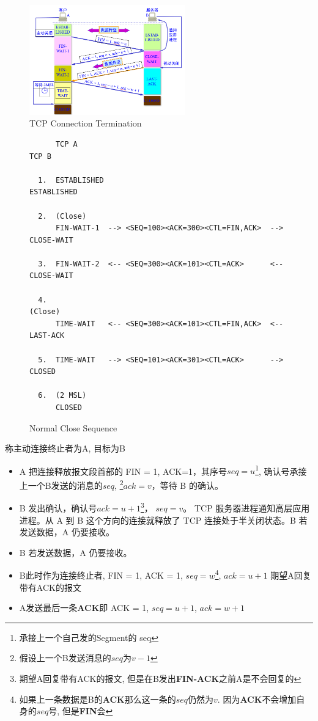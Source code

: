 \documentclass[a4paper]{report}
\begin{document}
\begin{figure}[H]
\centering
\includegraphics[width=0.6\textwidth]{tcp_close.png}
\caption{TCP Connection Termination}
\end{figure}

\begin{figure}[H]
\centering
\begin{verbatim}
      TCP A                                                TCP B

  1.  ESTABLISHED                                          ESTABLISHED

  2.  (Close)
      FIN-WAIT-1  --> <SEQ=100><ACK=300><CTL=FIN,ACK>  --> CLOSE-WAIT

  3.  FIN-WAIT-2  <-- <SEQ=300><ACK=101><CTL=ACK>      <-- CLOSE-WAIT

  4.                                                       (Close)
      TIME-WAIT   <-- <SEQ=300><ACK=101><CTL=FIN,ACK>  <-- LAST-ACK

  5.  TIME-WAIT   --> <SEQ=101><ACK=301><CTL=ACK>      --> CLOSED

  6.  (2 MSL)
      CLOSED
\end{verbatim}
\caption{Normal Close Sequence}
\end{figure}
称主动连接终止者为A, 目标为B
\begin{itemize}
  \item A 把连接释放报文段首部的 FIN = 1, ACK=1，其序号$seq = u$\footnote{承接上一个自己发的Segment的 seq}, 确认号承接上一个B发送的消息的$seq$, \footnote{假设上一个B发送消息的$seq$为$v-1$}$ack=v$，等待 B 的确认。
  \item B 发出确认，确认号$ack = u +1$\footnote{期望A回复带有ACK的报文, 但是在B发出\textbf{FIN-ACK}之前A是不会回复的}， $seq = v$。
  \subitem TCP 服务器进程通知高层应用进程。从 A 到 B 这个方向的连接就释放了
  \subitem TCP 连接处于半关闭状态。B 若发送数据，A 仍要接收。
  \item B 若发送数据，A 仍要接收。
  \item B此时作为连接终止者, FIN = 1, ACK = 1, $seq = w$\footnote{如果上一条数据是B的\textbf{ACK}那么这一条的$seq$仍然为$v$. 因为\textbf{ACK}不会增加自身的$seq$号, 但是\textbf{FIN}会}, $ack= u +1$
  \subitem 期望A回复带有ACK的报文
  \item A发送最后一条\textbf{ACK}即 ACK = 1, $seq = u + 1$, $ack = w + 1$
\end{itemize}
\end{document}

